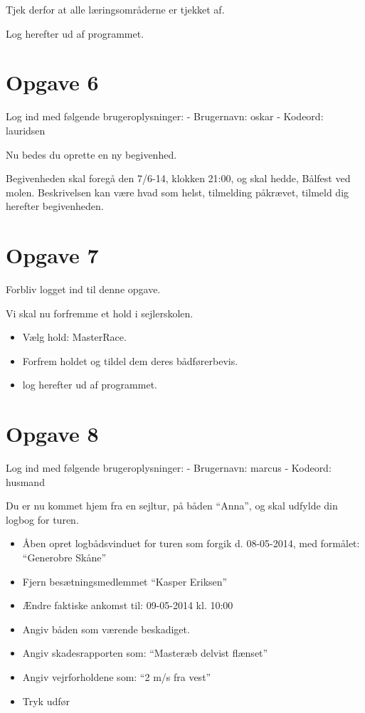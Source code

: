 Tjek derfor at alle læringsområderne er tjekket af.

Log herefter ud af programmet.


\section{Opgave 6}

Log ind med følgende brugeroplysninger: 
\newline - Brugernavn: oskar
\newline - Kodeord: lauridsen

Nu bedes du oprette en ny begivenhed.

Begivenheden skal foregå den 7/6-14, klokken 21:00, og skal hedde, Bålfest ved molen. Beskrivelsen kan være hvad som helst, tilmelding påkrævet, tilmeld dig herefter begivenheden.


\section{Opgave 7}

Forbliv logget ind til denne opgave.

Vi skal nu forfremme et hold i sejlerskolen.

\begin{itemize}
\item Vælg hold: MasterRace.
\item Forfrem holdet og tildel dem deres bådførerbevis.
\item log herefter ud af programmet.
\end{itemize}

\section{Opgave 8}

Log ind med følgende brugeroplysninger: 
\newline - Brugernavn: marcus
\newline - Kodeord: husmand

Du er nu kommet hjem fra en sejltur, på båden ``Anna'', og skal udfylde din logbog for turen.

\begin{itemize}
	\item Åben opret logbådsvinduet for turen som forgik d. 08-05-2014, med formålet: ``Generobre Skåne''
	\item Fjern besætningsmedlemmet ``Kasper Eriksen''
	\item Ændre faktiske ankomst til: 09-05-2014 kl. 10:00
	\item Angiv båden som værende beskadiget.
	\item Angiv skadesrapporten som: ``Masteræb delvist flænset''
	\item Angiv vejrforholdene som: ``2 m/s fra vest''
	\item Tryk udfør
\end{itemize}


